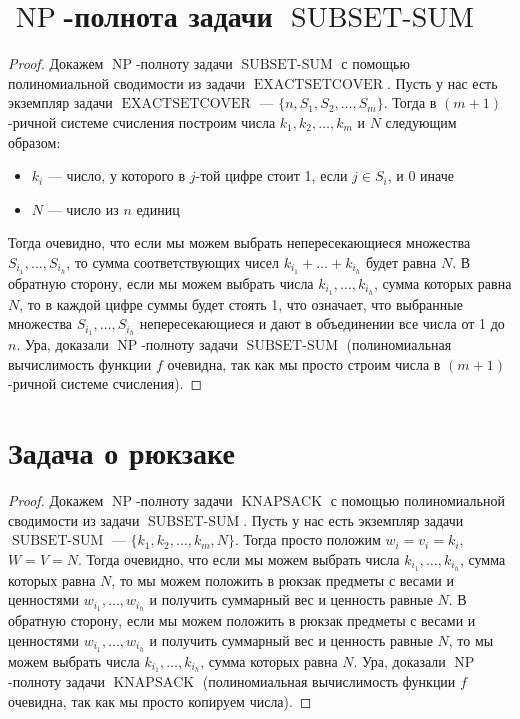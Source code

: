 \documentclass[11pt]{article}
\DeclareMathOperator{\NP}{NP}
\DeclareMathOperator{\EXACTSETC}{EXACTSETCOVER}
\DeclareMathOperator{\SUBSUM}{SUBSET-SUM}
\DeclareMathOperator{\KNAPSACK}{KNAPSACK}
\begin{document}
\section{$\NP$-полнота задачи $\SUBSUM$}

\begin{proof}
  Докажем $\NP$-полноту задачи $\SUBSUM$ с помощью полиномиальной сводимости из задачи $\EXACTSETC$. Пусть у нас есть экземпляр задачи $\EXACTSETC$ --- $\{n, S_1, S_2, \ldots, S_m\}$.
  Тогда в $(m+1)$-ричной системе счисления построим числа $k_1, k_2, \ldots, k_m$ и $N$ следующим образом:
  \begin{itemize}
    \item $k_i$ --- число, у которого в $j$-той цифре стоит 1, если $j \in S_i$, и 0 иначе
    \item $N$ --- число из $n$ единиц
  \end{itemize} 
  Тогда очевидно, что если мы можем выбрать непересекающиеся множества $S_{i_1}, \ldots, S_{i_h}$, то сумма соответствующих чисел $k_{i_1} + \ldots + k_{i_h}$ будет равна $N$.
  В обратную сторону, если мы можем выбрать числа $k_{i_1}, \ldots, k_{i_h}$, сумма которых равна $N$, то в каждой цифре суммы будет стоять 1, что означает, что выбранные множества $S_{i_1}, \ldots, S_{i_h}$ непересекающиеся и дают в объединении все числа от 1 до $n$.
  Ура, доказали $\NP$-полноту задачи $\SUBSUM$ (полиномиальная вычислимость функции $f$ очевидна, так как мы просто строим числа в $(m+1)$-ричной системе счисления).
\end{proof}

\section{Задача о рюкзаке}

\begin{proof}
  Докажем $\NP$-полноту задачи $\KNAPSACK$ с помощью полиномиальной сводимости из задачи $\SUBSUM$. Пусть у нас есть экземпляр задачи $\SUBSUM$ --- $\{k_1, k_2, \ldots, k_m, N\}$.
  Тогда просто положим $w_i = v_i = k_i$, $W = V = N$. Тогда очевидно, что если мы можем выбрать числа $k_{i_1}, \ldots, k_{i_h}$, сумма которых равна $N$, то мы можем положить в рюкзак предметы с весами и ценностями $w_{i_1}, \ldots, w_{i_h}$ и получить суммарный вес и ценность равные $N$.
  В обратную сторону, если мы можем положить в рюкзак предметы с весами и ценностями $w_{i_1}, \ldots, w_{i_h}$ и получить суммарный вес и ценность равные $N$, то мы можем выбрать числа $k_{i_1}, \ldots, k_{i_h}$, сумма которых равна $N$.
  Ура, доказали $\NP$-полноту задачи $\KNAPSACK$ (полиномиальная вычислимость функции $f$ очевидна, так как мы просто копируем числа).
\end{proof}
\end{document}
